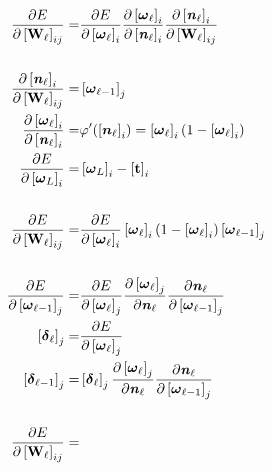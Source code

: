 \documentclass[10pt]{article} %
\begin{document}
\color{fgC}\pagecolor{bgC} \begin{align*}\frac{\partial E}{\partial \left[ \bold{W}_\ell \right]_{ij}} =&
\frac{\partial E}{\partial \left[ \boldsymbol{\omega}_\ell \right]_i } 
\frac{\partial \left[ \boldsymbol{\omega}_\ell \right]_i }{ \partial \left[ \textbf{\textit{n}}_\ell \right]_i }
\frac{ \partial \left[ \textbf{\textit{n}}_\ell \right]_i }{ \partial \left[ \bold{W}_\ell \right]_{ij} } \\ 
\\
\frac{ \partial \left[ \textbf{\textit{n}}_\ell \right]_i }{ \partial \left[ \bold{W}_\ell \right]_{ij} } =& \left[ \boldsymbol{\omega}_{\ell - 1} \right]_j \\
\frac{\partial \left[ \boldsymbol{\omega}_\ell \right]_i }{ \partial \left[ \textbf{\textit{n}}_\ell \right]_i } =& 
\varphi'(\left[ \boldsymbol{n}_\ell \right]_i) = \left[ \boldsymbol{\omega}_\ell \right]_i(1 - \left[ \boldsymbol{\omega}_\ell \right]_i) \\
\frac{\partial E}{\partial \left[ \boldsymbol{\omega}_L \right]_i } =& \left[ \boldsymbol{\omega}_L \right]_i - \left[ \bold{t} \right]_i \\ 
\\
\frac{\partial E}{\partial \left[ \bold{W}_\ell \right]_{ij}} =& 
\frac{\partial E}{\partial \left[ \boldsymbol{\omega}_\ell \right]_i } 
\left[ \boldsymbol{\omega}_\ell \right]_i(1 - \left[ \boldsymbol{\omega}_\ell \right]_i) 
\left[ \boldsymbol{\omega}_{\ell - 1} \right]_j \\
\\
\frac{\partial E}{\partial \left[ \boldsymbol{\omega}_{\ell - 1} \right]_j} =& 
\frac{\partial E}{\partial \left[ \boldsymbol{\omega}_{\ell} \right]_j}
\frac{\partial \left[ \boldsymbol{\omega}_{\ell} \right]_j}{\partial \textbf{\textit{n}}_\ell}
\frac{\partial \textbf{\textit{n}}_\ell}{\partial \left[ \boldsymbol{\omega}_{\ell - 1} \right]_j} \\
\left[ \boldsymbol{\delta}_{\ell} \right]_j =& \frac{\partial E}{\partial \left[ \boldsymbol{\omega}_{\ell} \right]_j} \\
\left[ \boldsymbol{\delta}_{\ell - 1} \right]_j =& \left[ \boldsymbol{\delta}_{\ell} \right]_j
\frac{\partial \left[ \boldsymbol{\omega}_{\ell} \right]_j}{\partial \textbf{\textit{n}}_\ell}
\frac{\partial \textbf{\textit{n}}_\ell}{\partial \left[ \boldsymbol{\omega}_{\ell - 1} \right]_j} \\
\\
\frac{\partial E}{\partial \left[ \bold{W}_\ell \right]_{ij}} =& 

\end{align*}
\end{document}
